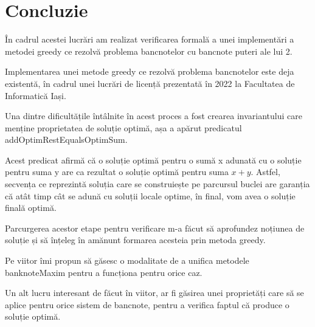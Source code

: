 \chapter*{Concluzie} 

În cadrul acestei lucrări am realizat verificarea formală a unei implementări a metodei greedy ce rezolvă problema 
bancnotelor cu bancnote puteri ale lui 2.\par
Implementarea unei metode greedy ce rezolvă problema bancnotelor este deja existentă, în cadrul unei lucrări de 
licență prezentată în 2022 la Facultatea de Informatică Iași.\cite{elisa:1}\par
Una dintre dificultățile întâlnite în acest proces a fost crearea invariantului care menține proprietatea de soluție
optimă, așa a apărut predicatul addOptimRestEqualsOptimSum.\par
Acest predicat afirmă că o soluție optimă pentru o sumă x adunată cu o soluție pentru suma y are ca rezultat o 
soluție optimă pentru suma $x+y$. Astfel, secvența ce reprezintă soluția care se construiește pe parcursul buclei 
are garanția că atât timp cât se adună cu soluții locale optime, în final, vom avea o soluție finală optimă.\par
Parcurgerea acestor etape pentru verificare m-a făcut să aprofundez noțiunea de soluție și să înțeleg în amănunt 
formarea acesteia prin metoda greedy.\par
Pe viitor îmi propun să găsesc o modalitate de a unifica metodele banknoteMaxim pentru a funcționa pentru orice caz.\par
Un alt lucru interesant de făcut în viitor, ar fi găsirea unei proprietăți care să se aplice pentru orice sistem 
de bancnote, pentru a verifica faptul că produce o soluție optimă.
 